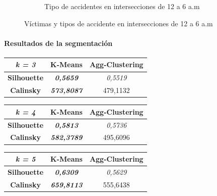 \begin{figure}[H]
\begin{subfigure}{.5\textwidth}
  \caption{Tipo de accidentes en intersecciones de 12 a 6 a.m}
  \label{fig:sfig2}
\end{subfigure}
\caption{Víctimas y tipos de accidente en intersecciones de 12 a 6 a.m}
\label{fig:fig}
\end{figure}

\paragraph{Resultados de la segmentación}

\begin{table}[H]
\begin{subtable}[H]{0.45\textwidth}
        \centering
\begin{tabular}{|c|c|c|}
\hline
\textit{k = 3}      & \textbf{K-Means}           & \textbf{Agg-Clustering} \\ \hline
\textbf{Silhouette} & \textit{\textbf{0,5659}}   & \textit{0,5519}         \\ \hline
\textbf{Calinsky}   & \textit{\textbf{573,8087}} & 479,1132                \\ \hline
\end{tabular}
\end{subtable}
\hfill
\begin{subtable}[H]{0.45\textwidth}
        \centering
\begin{tabular}{|c|c|c|}
\hline
\textit{k = 4}      & \textbf{K-Means}           & \textbf{Agg-Clustering} \\ \hline
\textbf{Silhouette} & \textit{\textbf{0,5813}}   & \textit{0,5736}         \\ \hline
\textbf{Calinsky}   & \textit{\textbf{582,3789}} & 495,6096                \\ \hline
\end{tabular}
\end{subtable}
\begin{subtable}[H]{0.45\textwidth}
        \centering
\begin{tabular}{|c|c|c|}
\hline
\textit{k = 5}      & \textbf{K-Means}           & \textbf{Agg-Clustering} \\ \hline
\textbf{Silhouette} & \textit{\textbf{0,6309}}   & \textit{0,5629}         \\ \hline
\textbf{Calinsky}   & \textit{\textbf{659,8113}} & 555,6438                \\ \hline
\end{tabular}
\end{subtable}
\hfill
\begin{subtable}[H]{0.45\textwidth}

\end{subtable}
\end{table}
